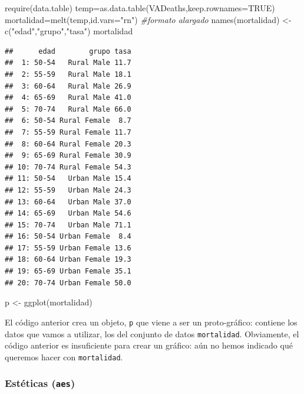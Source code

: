 \documentclass[
]{article}
\newenvironment{Shaded}{\begin{snugshade}}{\end{snugshade}}
\newcommand{\AttributeTok}[1]{\textcolor[rgb]{0.77,0.63,0.00}{#1}}
\newcommand{\CommentTok}[1]{\textcolor[rgb]{0.56,0.35,0.01}{\textit{#1}}}
\newcommand{\ConstantTok}[1]{\textcolor[rgb]{0.00,0.00,0.00}{#1}}
\newcommand{\FunctionTok}[1]{\textcolor[rgb]{0.00,0.00,0.00}{#1}}
\newcommand{\NormalTok}[1]{#1}
\newcommand{\OtherTok}[1]{\textcolor[rgb]{0.56,0.35,0.01}{#1}}
\newcommand{\StringTok}[1]{\textcolor[rgb]{0.31,0.60,0.02}{#1}}
\numberwithin{ejcnt}{section}
\begin{document}
\begin{Shaded}
\begin{Highlighting}[]
\FunctionTok{require}\NormalTok{(data.table)}
\NormalTok{temp}\OtherTok{=}\FunctionTok{as.data.table}\NormalTok{(VADeaths,}\AttributeTok{keep.rownames=}\ConstantTok{TRUE}\NormalTok{)}
\NormalTok{mortalidad}\OtherTok{=}\FunctionTok{melt}\NormalTok{(temp,}\AttributeTok{id.vars=}\StringTok{"rn"}\NormalTok{) }\CommentTok{\#formato alargado}
\FunctionTok{names}\NormalTok{(mortalidad) }\OtherTok{\textless{}{-}} \FunctionTok{c}\NormalTok{(}\StringTok{"edad"}\NormalTok{,}\StringTok{"grupo"}\NormalTok{,}\StringTok{"tasa"}\NormalTok{)}
\NormalTok{mortalidad}
\end{Highlighting}
\end{Shaded}

\begin{verbatim}
##      edad        grupo tasa
##  1: 50-54   Rural Male 11.7
##  2: 55-59   Rural Male 18.1
##  3: 60-64   Rural Male 26.9
##  4: 65-69   Rural Male 41.0
##  5: 70-74   Rural Male 66.0
##  6: 50-54 Rural Female  8.7
##  7: 55-59 Rural Female 11.7
##  8: 60-64 Rural Female 20.3
##  9: 65-69 Rural Female 30.9
## 10: 70-74 Rural Female 54.3
## 11: 50-54   Urban Male 15.4
## 12: 55-59   Urban Male 24.3
## 13: 60-64   Urban Male 37.0
## 14: 65-69   Urban Male 54.6
## 15: 70-74   Urban Male 71.1
## 16: 50-54 Urban Female  8.4
## 17: 55-59 Urban Female 13.6
## 18: 60-64 Urban Female 19.3
## 19: 65-69 Urban Female 35.1
## 20: 70-74 Urban Female 50.0
\end{verbatim}

\begin{Shaded}
\begin{Highlighting}[]
\NormalTok{p }\OtherTok{\textless{}{-}} \FunctionTok{ggplot}\NormalTok{(mortalidad)}
\end{Highlighting}
\end{Shaded}

El código anterior crea un objeto, \texttt{p} que viene a ser un proto-gráfico: contiene los datos que vamos a utilizar, los del conjunto de datos \texttt{mortalidad}. Obviamente, el código anterior es insuficiente para crear un gráfico: aún no hemos indicado qué queremos hacer con \texttt{mortalidad}.

\hypertarget{estuxe9ticas-aes}{%
\subsubsection{\texorpdfstring{Estéticas (\texttt{aes})}{Estéticas (aes)}}\label{estuxe9ticas-aes}}
\end{document}
